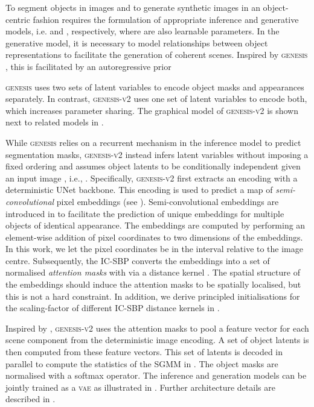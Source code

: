 \documentclass{article}
\begin{document}
To segment objects in images and to generate synthetic images in an object-centric fashion requires the formulation of appropriate inference and generative models, i.e.  and , respectively, where  are also learnable parameters.
In the generative model, it is necessary to model relationships between object representations to facilitate the generation of coherent scenes.
Inspired by \textsc{genesis} \cite{engelcke2020genesis}, this is facilitated by an autoregressive prior

\textsc{genesis} uses two sets of latent variables to encode object masks and appearances separately.
In contrast, \textsc{genesis-v2} uses one set of latent variables  to encode both, which increases parameter sharing.
The graphical model of \textsc{genesis-v2} is shown next to related models in .

While \textsc{genesis} relies on a recurrent mechanism in the inference model to predict segmentation masks, \textsc{genesis-v2} instead infers latent variables without imposing a fixed ordering and assumes object latents  to be conditionally independent given an input image , i.e., .
Specifically, \textsc{genesis-v2} first extracts an encoding with a deterministic UNet backbone.
This encoding is used to predict a map of \emph{semi-convolutional} pixel embeddings  (see \cite{novotny2018semi}).
Semi-convolutional embeddings are introduced in \citet{novotny2018semi} to facilitate the prediction of unique embeddings for multiple objects of identical appearance.
The embeddings are computed by performing an element-wise addition of pixel coordinates to two dimensions of the embeddings.
In this work, we let the pixel coordinates be in the interval  relative to the image centre.
Subsequently, the IC-SBP converts the embeddings into a set of normalised \emph{attention masks}  with  via a distance kernel .
The spatial structure of the embeddings should induce the attention masks to be spatially localised, but this is not a hard constraint.
In addition, we derive principled initialisations for the scaling-factor of different \mbox{IC-SBP} distance kernels  in .

Inspired by \citet{locatello2020object}, \textsc{genesis-v2} uses the attention masks  to pool a feature vector for each scene component from the deterministic image encoding.
A set of object latents  is then computed from these feature vectors.
This set of latents is decoded in parallel to compute the statistics of the SGMM in .
The object masks  are normalised with a softmax operator.
The inference and generation models can be jointly trained as a \textsc{vae} as illustrated in .
Further architecture details are described in .
\end{document}
